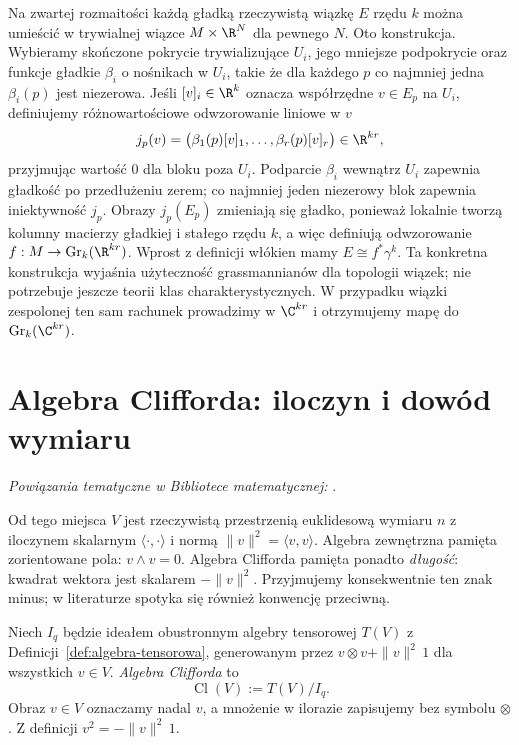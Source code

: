 \begin{uwaga}
Na zwartej rozmaitości każdą gładką rzeczywistą wiązkę $E$
rzędu $k$ można umieścić w trywialnej wiązce
$M\times\R^N$ dla pewnego $N$.
Oto konstrukcja. Wybieramy skończone pokrycie
trywializujące $U_i$, jego mniejsze podpokrycie
oraz funkcje gładkie $\beta_i$ o nośnikach w $U_i$,
takie że dla każdego $p$ co najmniej jedna
$\beta_i(p)$ jest niezerowa. Jeśli $[v]_i\in\R^k$
oznacza współrzędne $v\in E_p$ na $U_i$,
definiujemy różnowartościowe odwzorowanie liniowe w $v$
\[
 j_p(v)=\bigl(\beta_1(p)[v]_1,\ldots,
                  \beta_r(p)[v]_r\bigr)\in\R^{kr},
\]
przyjmując wartość $0$ dla bloku poza $U_i$.
Podparcie $\beta_i$ wewnątrz $U_i$ zapewnia
gładkość po przedłużeniu zerem; co najmniej
jeden niezerowy blok zapewnia iniektywność $j_p$.
Obrazy $j_p(E_p)$ zmieniają się gładko, ponieważ
lokalnie tworzą kolumny macierzy gładkiej i
stałego rzędu $k$, a więc definiują odwzorowanie
$f:M\to\operatorname{Gr}_k(\R^{kr})$.
Wprost z definicji włókien mamy
$E\cong f^*\gamma^k$. Ta konkretna konstrukcja
wyjaśnia użyteczność grassmannianów dla topologii
wiązek; nie potrzebuje jeszcze teorii klas
charakterystycznych.
W przypadku wiązki zespolonej ten sam rachunek
prowadzimy w $\C^{kr}$ i otrzymujemy mapę do
$\operatorname{Gr}_k(\C^{kr})$.
\end{uwaga}

\section{Algebra Clifforda: iloczyn i dowód wymiaru}
\label{sec:clifford}

\noindent\emph{Powiązania tematyczne w Bibliotece matematycznej:} .


Od tego miejsca $V$ jest rzeczywistą przestrzenią
euklidesową wymiaru $n$ z iloczynem skalarnym
$\langle\cdot,\cdot\rangle$ i normą
$\|v\|^2=\langle v,v\rangle$. Algebra zewnętrzna
pamięta zorientowane pola: $v\wedge v=0$.
Algebra Clifforda pamięta ponadto \emph{długość}:
kwadrat wektora jest skalarem $-\|v\|^2$.
Przyjmujemy konsekwentnie ten znak minus;
w literaturze spotyka się również konwencję przeciwną.

\begin{definicja}
\label{def:clifford}
Niech $I_q$ będzie ideałem obustronnym algebry
tensorowej $T(V)$ z Definicji~\ref{def:algebra-tensorowa},
generowanym przez
$v\otimes v+\|v\|^2\,1$ dla wszystkich $v\in V$.
\emph{Algebra Clifforda} to
\[
 \operatorname{Cl}(V):=T(V)/I_q.
\]
Obraz $v\in V$ oznaczamy nadal $v$,
a mnożenie w ilorazie zapisujemy bez symbolu $\otimes$.
Z definicji $v^2=-\|v\|^2\,1$.
\end{definicja}

